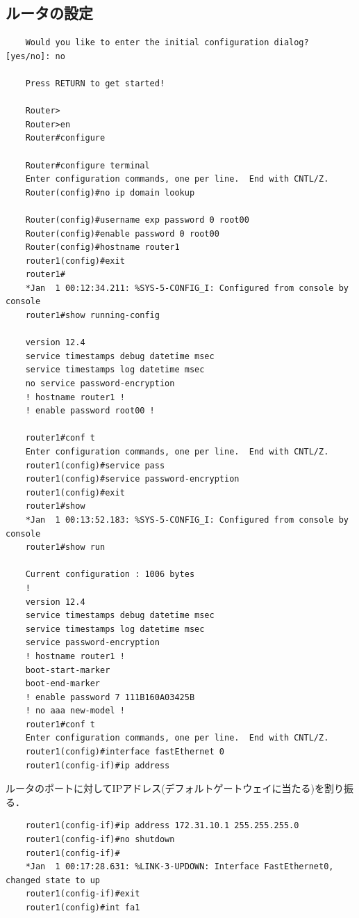 \documentclass{jlreq}
\begin{document}
  \subsection{ルータの設定}
  \begin{lstlisting}
    Would you like to enter the initial configuration dialog? [yes/no]: no

    Press RETURN to get started!

    Router>
    Router>en
    Router#configure

    Router#configure terminal
    Enter configuration commands, one per line.  End with CNTL/Z.
    Router(config)#no ip domain lookup

    Router(config)#username exp password 0 root00
    Router(config)#enable password 0 root00
    Router(config)#hostname router1
    router1(config)#exit
    router1#
    *Jan  1 00:12:34.211: %SYS-5-CONFIG_I: Configured from console by console
    router1#show running-config

    version 12.4
    service timestamps debug datetime msec
    service timestamps log datetime msec
    no service password-encryption
    ! hostname router1 !
    ! enable password root00 !
    
    router1#conf t
    Enter configuration commands, one per line.  End with CNTL/Z.
    router1(config)#service pass
    router1(config)#service password-encryption
    router1(config)#exit
    router1#show
    *Jan  1 00:13:52.183: %SYS-5-CONFIG_I: Configured from console by console
    router1#show run

    Current configuration : 1006 bytes
    !
    version 12.4
    service timestamps debug datetime msec
    service timestamps log datetime msec
    service password-encryption
    ! hostname router1 !
    boot-start-marker
    boot-end-marker
    ! enable password 7 111B160A03425B
    ! no aaa new-model !
    router1#conf t
    Enter configuration commands, one per line.  End with CNTL/Z.
    router1(config)#interface fastEthernet 0
    router1(config-if)#ip address
    \end{lstlisting}
    ルータのポートに対してIPアドレス(デフォルトゲートウェイに当たる)を割り振る．
    \begin{lstlisting}
    router1(config-if)#ip address 172.31.10.1 255.255.255.0
    router1(config-if)#no shutdown
    router1(config-if)#
    *Jan  1 00:17:28.631: %LINK-3-UPDOWN: Interface FastEthernet0, changed state to up
    router1(config-if)#exit
    router1(config)#int fa1
    \end{lstlisting}
\end{document}

